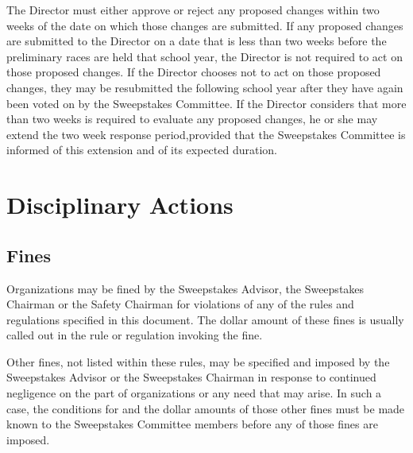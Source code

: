 The Director must either approve or reject any proposed changes within two weeks of the date on which those changes are submitted. If any proposed changes are submitted to the Director on a date that is less than two weeks before the preliminary races are held that school year, the Director is not required to act on those proposed changes. If the Director chooses not to act on those proposed changes, they may be resubmitted the following school year after they have again been voted on by the Sweepstakes Committee. If the Director considers that more than two weeks is required to evaluate any proposed changes, he or she may extend the two week response period,provided that the Sweepstakes Committee is informed of this extension and of its expected duration.

\section{Disciplinary Actions}

\subsection{Fines}

Organizations may be fined by the Sweepstakes Advisor, the Sweepstakes Chairman or the Safety Chairman for violations of any of the rules and regulations specified in this document. The dollar amount of these fines is usually called out in the rule or regulation invoking the fine.

Other fines, not listed within these rules, may be specified and imposed by the Sweepstakes Advisor or the Sweepstakes Chairman in response to continued negligence on the part of organizations or any need that may arise. In such a case, the conditions for and the dollar amounts of those other fines must be made known to the Sweepstakes Committee members before any of those fines are imposed.

